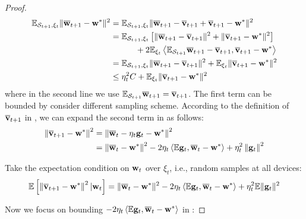 \begin{proof}
	

\begin{align}
\mathbb{E}_{{\mathcal{S}}_{t+1}, \xi_{t}} \|\overline{{\mathbf{w}}}_{t+1} - {\mathbf{w}}^*\|^2 &= \mathbb{E}_{{\mathcal{S}}_{t+1}, \xi_{t}} \|\overline{{\mathbf{w}}}_{t+1} - \overline{{\mathbf{v}}}_{t+1} + \overline{{\mathbf{v}}}_{t+1} - {\mathbf{w}}^*\|^2\\
&= \mathbb{E}_{{\mathcal{S}}_{t+1}, \xi_{t}} \left[\|\overline{{\mathbf{w}}}_{t+1} - \overline{{\mathbf{v}}}_{t+1}\|^2 + \|\overline{{\mathbf{v}}}_{t+1} - {\mathbf{w}}^*\|^2\right] \\
& \hspace{3em}+ 2\mathbb{E}_{\xi_{t}} \left<\mathbb{E}_{{\mathcal{S}}_{t+1}} \overline{{\mathbf{w}}}_{t+1} - \overline{{\mathbf{v}}}_{t+1},   \overline{{\mathbf{v}}}_{t+1} - {\mathbf{w}}^*\right> \\
& = \mathbb{E}_{{\mathcal{S}}_{t+1}, \xi_{t}} \|\overline{{\mathbf{w}}}_{t+1} - \overline{{\mathbf{v}}}_{t+1}\|^2 + \mathbb{E}_{\xi_t} \|\overline{{\mathbf{v}}}_{t+1} - {\mathbf{w}}^*\|^2 \\
& \leq  \eta_t^2 C + \mathbb{E}_{\xi_t} \|\overline{{\mathbf{v}}}_{t+1} - {\mathbf{w}}^*\|^2 \label{eq:sgdcvxsmth1}
\end{align}
where in the second line we use $\mathbb{E}_{{\mathcal{S}}_{t+1}} \overline{{\mathbf{w}}}_{t+1}  = \overline{{\mathbf{v}}}_{t+1}$. 
The first term can be bounded by consider different sampling scheme. 
According to the definition of $\overline{{\mathbf{v}}}_{t+1}$ in \eq{\ref{eq:vbar}}, we can expand the second term in \eq{\ref{eq:sgdcvxsmth1}} as follows:
$$\begin{aligned}\left\|{\overline{\mathbf{v}}}_{t+1}-{\mathbf{w}}^{*}\right\|^2 &=\left\|{\overline{\mathbf{w}}}_{t}-\eta_{t} {\mathbf{g}}_{t}-{\mathbf{w}}^{*}\right\|^2 \\ &=\left\|{\overline{\mathbf{w}}}_{t}-{\mathbf{w}}^{*}\right\|^{2}-2 \eta_{t} \left<\mathbb{E} {\mathbf{g}}_{t}, {\overline{\mathbf{w}}}_{t}-{\mathbf{w}}^{*} \right>+\eta_{t}^{2}\left\|{\mathbf{g}}_{t}\right\|^{2} \end{aligned}$$

Take the expectation condition on ${\mathbf{w}}_t$ over $\xi_t$, i.e., random samples at all devices:
\begin{align}
\mathbb{E}\left[\left\|{\overline{\mathbf{v}}}_{t+1}-{\mathbf{w}}^{*}\right\|^2| {\mathbf{w}}_{t}\right]=\|{\overline{\mathbf{w}}}_{t}-{\mathbf{w}}^{*}\|^{2}-2 \eta_{t} \left<\mathbb{E} {\mathbf{g}}_{t}, {\overline{\mathbf{w}}}_{t}-{\mathbf{w}}^{*} \right> +\eta_{t}^{2} \mathbb{E}\| {\mathbf{g}}_{t} \|^{2}	
\label{eq:expandsgd}
\end{align}

Now we focus on bounding $-2 \eta_{t} \left< \mathbb{E} {\mathbf{g}}_{t}, {\overline{\mathbf{w}}}_{t}-{\mathbf{w}}^{*}\right>$ in \eq{\ref{eq:expandsgd}}: 


\end{proof}

